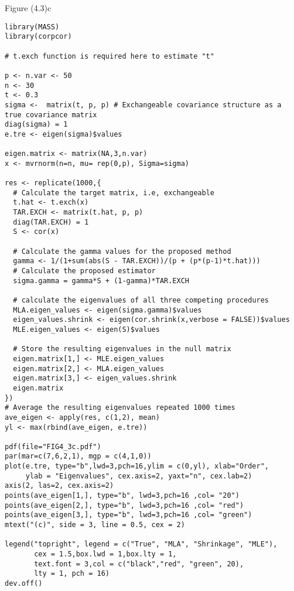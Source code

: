 Figure (4.3)c
\begin{lstlisting}
library(MASS)
library(corpcor)

# t.exch function is required here to estimate "t"

p <- n.var <- 50
n <- 30
t <- 0.3
sigma <-  matrix(t, p, p) # Exchangeable covariance structure as a true covariance matrix
diag(sigma) = 1
e.tre <- eigen(sigma)$values

eigen.matrix <- matrix(NA,3,n.var)
x <- mvrnorm(n=n, mu= rep(0,p), Sigma=sigma)

res <- replicate(1000,{
  # Calculate the target matrix, i.e, exchangeable
  t.hat <- t.exch(x)
  TAR.EXCH <- matrix(t.hat, p, p)
  diag(TAR.EXCH) = 1
  S <- cor(x)
  
  # Calculate the gamma values for the proposed method
  gamma <- 1/(1+sum(abs(S - TAR.EXCH))/(p + (p*(p-1)*t.hat)))
  # Calculate the proposed estimator 
  sigma.gamma = gamma*S + (1-gamma)*TAR.EXCH
  
  # calculate the eigenvalues of all three competing procedures
  MLA.eigen_values <- eigen(sigma.gamma)$values
  eigen_values.shrink <- eigen(cor.shrink(x,verbose = FALSE))$values
  MLE.eigen_values <- eigen(S)$values
  
  # Store the resulting eigenvalues in the null matrix 
  eigen.matrix[1,] <- MLE.eigen_values
  eigen.matrix[2,] <- MLA.eigen_values
  eigen.matrix[3,] <- eigen_values.shrink
  eigen.matrix
})
# Average the resulting eigenvalues repeated 1000 times
ave_eigen <- apply(res, c(1,2), mean)
yl <- max(rbind(ave_eigen, e.tre))

pdf(file="FIG4_3c.pdf")
par(mar=c(7,6,2,1), mgp = c(4,1,0))
plot(e.tre, type="b",lwd=3,pch=16,ylim = c(0,yl), xlab="Order",
     ylab = "Eigenvalues", cex.axis=2, yaxt="n", cex.lab=2)
axis(2, las=2, cex.axis=2)
points(ave_eigen[1,], type="b", lwd=3,pch=16 ,col= "20")
points(ave_eigen[2,], type="b", lwd=3,pch=16 ,col= "red")
points(ave_eigen[3,], type="b", lwd=3,pch=16 ,col= "green")
mtext("(c)", side = 3, line = 0.5, cex = 2)

legend("topright", legend = c("True", "MLA", "Shrinkage", "MLE"),
       cex = 1.5,box.lwd = 1,box.lty = 1,
       text.font = 3,col = c("black","red", "green", 20),
       lty = 1, pch = 16)
dev.off()
\end{lstlisting}

